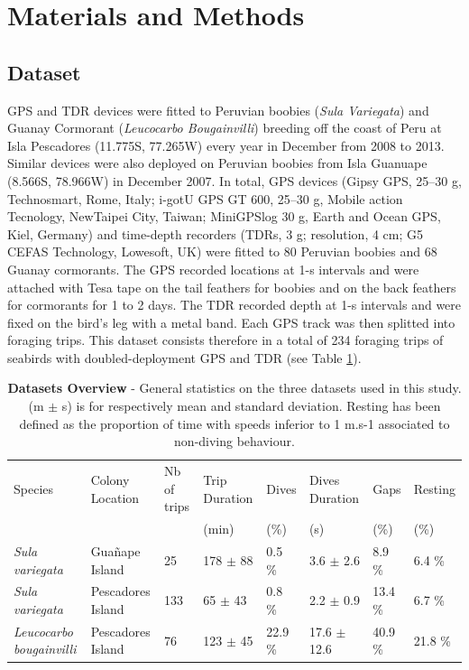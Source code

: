 \documentclass{article}
\begin{document}
\section{Materials and Methods}
\subsection{Dataset}

GPS and TDR devices were fitted to Peruvian boobies (\textit{Sula Variegata}) and Guanay Cormorant
(\textit{Leucocarbo Bougainvilli}) breeding off the coast of Peru at Isla Pescadores (11.775\degree S, 77.265\degree W) every year in December from 2008 to 2013. Similar devices were also deployed on Peruvian boobies from Isla Guanuape (8.566\degree S, 78.966\degree W) in December 2007.
In total, GPS devices (Gipsy GPS, 25–30 g, Technosmart, Rome, Italy; i-gotU GPS GT 600, 25–30 g, Mobile action Tecnology, NewTaipei City, Taiwan; MiniGPSlog 30 g, Earth and Ocean GPS, Kiel, Germany) and time-depth recorders (TDRs, 3 g; resolution, 4 cm; G5
CEFAS Technology, Lowesoft, UK) were fitted to 80 Peruvian boobies and 68 Guanay cormorants. The GPS recorded locations at 1-s intervals and were attached with Tesa tape on the tail feathers for boobies and on the back feathers for cormorants for 1 to 2 days. The TDR recorded depth at 1-s intervals and were fixed on the bird's leg with a metal band. Each GPS track was then splitted into foraging trips. This dataset consists therefore in a total of 234 foraging trips of seabirds with doubled-deployment GPS and TDR (see Table \ref{table1}).

\begin{table}[!h]
 \caption{\textbf{Datasets Overview} - General statistics on the three datasets used in this study. (m $\pm$ s) is for respectively mean and standard deviation. Resting has been defined as the proportion of time with speeds inferior to 1 m.s-1 associated to non-diving behaviour.}
  \centering
  \begin{tabular}{llllllll}
    \toprule
    Species  &  Colony Location & Nb of trips  & Trip Duration & Dives  & Dives Duration & Gaps & Resting \\
      &    &     & (min) & (\%) & (s) & (\%) & (\%) \\
    \midrule
    \textit{Sula variegata}         & Gua\~nape Island    & 25   & 178 $\pm$ 88  & 0.5 \%  & 3.6 $\pm$ 2.6 & 8.9 \% & 6.4 \%\\
    \textit{Sula variegata}         & Pescadores Island & 133 & 65 $\pm$ 43  & 0.8 \%  & 2.2 $\pm$ 0.9  & 13.4 \% & 6.7 \%\\
    \textit{Leucocarbo bougainvilli}& Pescadores Island & 76   & 123 $\pm$ 45  & 22.9 \%  & 17.6 $\pm$ 12.6 & 40.9 \% & 21.8 \%\\
    \bottomrule
  \end{tabular}
  \label{table1}
\end{table}
\end{document}
